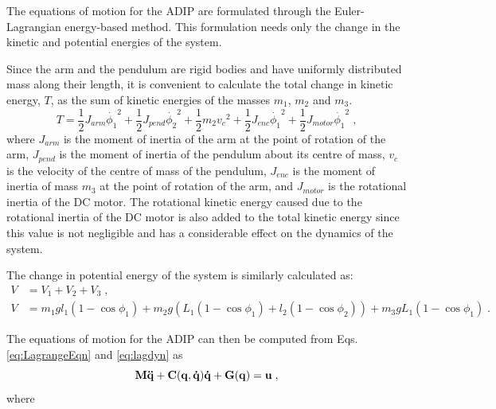 The equations of motion for the ADIP are formulated through the Euler-Lagrangian energy-based method. This formulation needs only the change in the kinetic and potential energies of the system.\par
Since the arm and the pendulum are rigid bodies and have uniformly distributed mass along their length, it is convenient to calculate the total change in kinetic energy, $T$, as the sum of kinetic energies of the masses $m_1$, $m_2$ and $m_3$. \\
\begin{equation*}
    T = \frac{1}{2}J_{arm}\Dot{\phi_1}^2 + \frac{1}{2}J_{pend}\Dot{\phi_2}^2 + \frac{1}{2}m_2{v_{c}}^2 + \frac{1}{2}J_{enc}\Dot{\phi_1}^2  + \frac{1}{2}J_{motor}\Dot{\phi_1}^2 \;,
\end{equation*}
where $J_{arm}$ is the moment of inertia of the arm at the point of rotation of the arm, $J_{pend}$ is the moment of inertia of the pendulum about its centre of mass, $v_c$ is the velocity of the centre of mass of the pendulum, $J_{enc}$ is the moment of inertia of mass $m_3$  at the point of rotation of the arm, and  $J_{motor}$ is the rotational inertia of the DC motor. The rotational kinetic energy caused due to the rotational inertia of the DC motor is also added to the total kinetic energy since this value is not negligible and has a considerable effect on the dynamics of the system. \par
The change in potential energy of the system is similarly calculated as:
\begin{align*}
    V &= V_{1} + V_{2} + V_{3}\;, \\
    V &= m_1gl_1(1-\cos{\phi_1}) + m_2g(L_1(1-\cos{\phi_1}) + l_2(1-\cos{\phi_2})) + m_3gL_1(1-\cos{\phi_1})\;.
\end{align*}
\par
The equations of motion for the ADIP can then be computed from Eqs. \ref{eq:LagrangeEqn} and \ref{eq:lagdyn} as
\begin{equation}
\label{eq:ADIP_dyn}
    \mathbf{M}\mathbf{\Ddot{q}} + \mathbf{C(q,\Dot{q})}\mathbf{\Dot{q}} + \mathbf{G(q)} = \mathbf{u}\;,
\end{equation}
where
